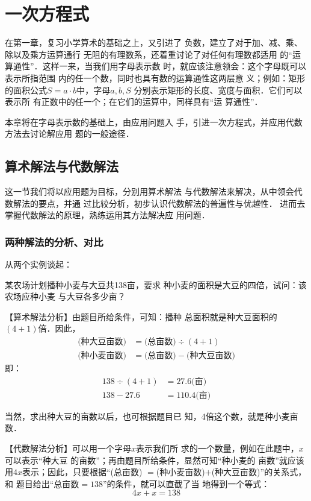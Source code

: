 \chapter{一次方程式}


    在第一章，复习小学算术的基础之上，又引进了
负数，建立了对于加、减、乘、除以及乘方运算通行
无阻的有理数系，还着重讨论了对任何有理数都适用
的“运算通性”．这样一来，当我们用字母表示数
时，就应该注意领会：这个字母既可以表示所指范围
内的任一个数，同时也具有数的运算通性这两层意
义；例如：矩形的面积公式$S=a\cdot b$中，字母$a,  b,  S$
分别表示矩形的长度、宽度与面积．它们可以表示所
有正数中的任一个；在它们的运算中，同样具有“运
算通性”．

    本章将在字母表示数的基础上，由应用问题入
手，引进一次方程式，并应用代数方法去讨论解应用
题的一般途径．

\section{算术解法与代数解法}
    这一节我们将以应用题为目标，分别用算术解法
与代数解法来解决，从中领会代数解法的要点，并通
过比较分析，初步认识代数解法的普遍性与优越性．
进而去掌握代数解法的原理，熟练运用其方法解决应
用问题．

\subsection{两种解法的分析、对比}
从两个实例谈起：

\begin{example}
    某农场计划播种小麦与大豆共138亩，要求
种小麦的面积是大豆的四倍，试问：该农场应种小麦
与大豆各多少亩？
\end{example}

【算术解法分析】由题目所给条件，可知：播种
总面积就是种大豆面积的$(4 + 1)$倍．因此，
\[\begin{split}
    \text{(种大豆亩数)}&=\text{(总亩数)}\div (4 + 1)\\
    \text{(种小麦亩数)}&=\text{(总亩数)}-\text{(种大豆亩数)}
\end{split}\]
即：
\begin{align*}
    138\div(4 + 1)&=27.6\text{(亩)}\tag{大豆亩数}\\
    138-27. 6 &= 110.4\text{(亩)}\tag{小麦亩数}
\end{align*}

当然，求出种大豆的亩数以后，也可根据题目已
知，4倍这个数，就是种小麦亩数．

【代数解法分析】可以用一个字母$x$表示我们所
求的一个数量，例如在此题中，$x$可以表示“种大豆
的亩数”；再由题目所给条件，显然可知“种小麦的
亩数”就应该用$4x$表示；因此，只要根据“(总亩数)
$=$(种小麦亩数)$+$(种大豆亩数)”的关系式，和
题目给出“总亩数$=138$”的条件，就可以直截了当
地得到一个等式：
\[4x+x=138\]    

